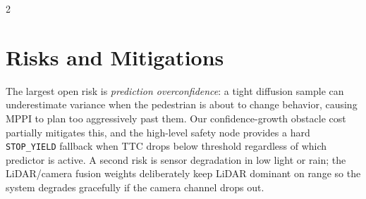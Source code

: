\documentclass[10pt,letterpaper]{article}
\begin{document}
\begin{multicols}{2}
\section{Risks and Mitigations}

The largest open risk is \emph{prediction overconfidence}: a tight
diffusion sample can underestimate variance when the pedestrian is
about to change behavior, causing MPPI to plan too aggressively past
them.  Our confidence-growth obstacle cost partially mitigates this,
and the high-level safety node provides a hard \texttt{STOP\_YIELD}
fallback when TTC drops below threshold regardless of which predictor
is active.  A second risk is sensor degradation in low light or rain;
the LiDAR/camera fusion weights deliberately keep LiDAR dominant on
range so the system degrades gracefully if the camera channel drops out.

\end{multicols}
\end{document}
